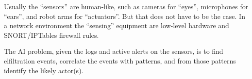Usually the ``sensors'' are human-like, such as cameras for ``eyes'',
microphones for ``ears'', and robot arms for ``actuators''. But that
does not have to be the case. In a network environment the ``sensing''
equipment are low-level hardware and SNORT/IPTables firewall rules.

The AI problem, given the logs and active alerts on the sensors, is to
find elfiltration events, correlate the events with patterns, and from
those patterns identify the likely actor(s).


